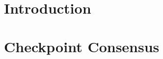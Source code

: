 \documentclass[a4paper,10pt,twoside]{report}
\author{\me}
\begin{document}


\normalsize

%
%
%
%
%
%
%
%
%
%
%
%
%
%
%
%
\chapter{Introduction}\label{chapter:intro}
\setcounter{page}{0}


\clearemptydoublepage

\chapter{Checkpoint Consensus}\label{chapter:consensus}


\clearemptydoublepage

%



%
%
%
\end{document}
